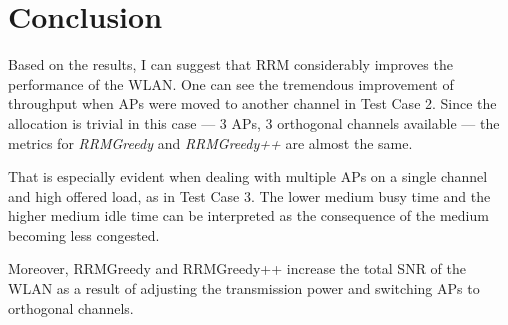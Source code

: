 \section{Conclusion}
\label{chap:impl:sec:conclusion}

Based on the results, I can suggest that RRM considerably improves the performance of the WLAN.
One can see the tremendous improvement of throughput when APs were moved to another channel in Test Case 2.
Since the allocation is trivial in this case --- 3 APs, 3 orthogonal channels available --- the metrics for \textit{RRMGreedy} and \textit{RRMGreedy++} are almost the same.

That is especially evident when dealing with multiple APs on a single channel and high offered load, as in Test Case 3. The lower medium busy time and the higher medium idle time can be interpreted as the consequence of the medium becoming less congested. 

Moreover, RRMGreedy and RRMGreedy++ increase the total SNR of the WLAN as a result of adjusting the transmission power and switching APs to orthogonal channels.

